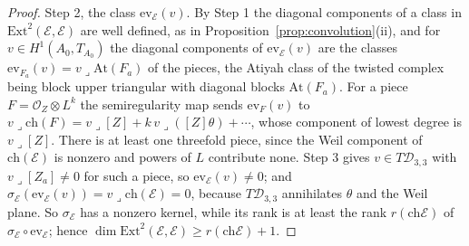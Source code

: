 \documentclass[11pt,reqno]{amsart}
\numberwithin{equation}{section}
\theoremstyle{plain}
\theoremstyle{definition}
\newcommand{\Ext}{\mathrm{Ext}}
\newcommand{\ch}{\mathrm{ch}}
\newcommand{\cD}{\mathcal{D}}
\begin{document}
\begin{proof}
Step 2, the class $\mathrm{ev}_{\mathcal{E}}(v)$. By Step 1 the diagonal components of a class in $\Ext^{2}(\mathcal{E},\mathcal{E})$ are well defined, as in Proposition~\ref{prop:convolution}(ii), and for $v\in H^{1}(A_{0},T_{A_{0}})$ the diagonal components of $\mathrm{ev}_{\mathcal{E}}(v)$ are the classes $\mathrm{ev}_{F_{a}}(v)=v\lrcorner\mathrm{At}(F_{a})$ of the pieces, the Atiyah class of the twisted complex being block upper triangular with diagonal blocks $\mathrm{At}(F_{a})$. For a piece $F=\mathcal{O}_{Z}\otimes L^{k}$ the semiregularity map sends $\mathrm{ev}_{F}(v)$ to $v\lrcorner\ch(F)=v\lrcorner[Z]+k\,v\lrcorner([Z]\theta)+\cdots$, whose component of lowest degree is $v\lrcorner[Z]$. There is at least one threefold piece, since the Weil component of $\ch(\mathcal{E})$ is nonzero and powers of $L$ contribute none. Step 3 gives $v\in T\cD_{3,3}$ with $v\lrcorner[Z_{a}]\ne0$ for such a piece, so $\mathrm{ev}_{\mathcal{E}}(v)\ne0$; and $\sigma_{\mathcal{E}}(\mathrm{ev}_{\mathcal{E}}(v))=v\lrcorner\ch(\mathcal{E})=0$, because $T\cD_{3,3}$ annihilates $\theta$ and the Weil plane. So $\sigma_{\mathcal{E}}$ has a nonzero kernel, while its rank is at least the rank $r(\ch\mathcal{E})$ of $\sigma_{\mathcal{E}}\circ\mathrm{ev}_{\mathcal{E}}$; hence $\dim\Ext^{2}(\mathcal{E},\mathcal{E})\ge r(\ch\mathcal{E})+1$.


\end{proof}
\end{document}
